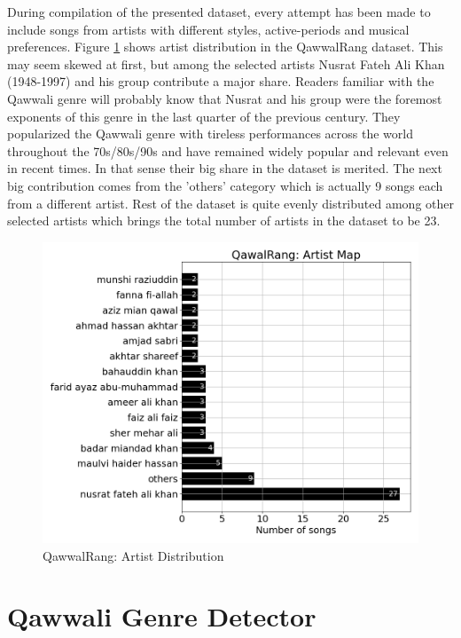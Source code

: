 \documentclass{article}
\begin{document}
During compilation of the presented dataset, every attempt has been made to include songs from artists with different styles, active-periods and musical preferences. Figure \ref{fig:author_dist} shows artist distribution in the QawwalRang dataset. This may seem skewed at first, but among the selected artists Nusrat Fateh Ali Khan (1948-1997) \citep{nusrat} and his group contribute a major share. Readers familiar with the Qawwali genre will probably know that Nusrat and his group were the foremost exponents of this genre in the last quarter of the previous century. They popularized the Qawwali genre with tireless performances across the world throughout the 70s/80s/90s and have remained widely popular and relevant even in recent times. In that sense their big share in the dataset is merited. The next big contribution comes from the 'others' category which is actually 9 songs each from a different artist. Rest of the dataset is quite evenly distributed among other selected artists which brings the total number of artists in the dataset to be 23.

\begin{figure}[htbp]
  \centering
  \includegraphics[scale=1.0, width=0.95\columnwidth]{artist}
  \caption{QawwalRang: Artist Distribution}
\label{fig:author_dist}
\end{figure}

\section{Qawwali Genre Detector}\label{sec:detector}
\end{document}
